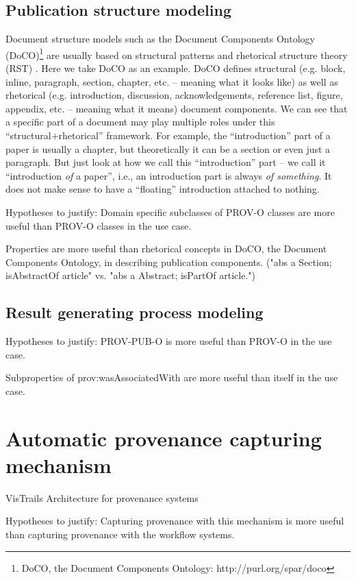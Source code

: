\subsection{Publication structure modeling}
Document structure models such as the Document Components Ontology (DoCO)\footnote{DoCO, the Document Components Ontology: http://purl.org/spar/doco} are usually based on structural patterns \cite{di2014dealing} and rhetorical structure theory (RST) \cite{taboada2006rhetorical}. Here we take DoCO as an example. DoCO defines structural (e.g. block, inline, paragraph, section, chapter, etc. -- meaning what it looks like) as well as rhetorical (e.g. introduction, discussion, acknowledgements, reference list, figure, appendix, etc. -- meaning what it means) document components. We can see that a specific part of a document may play multiple roles under this ``structural+rhetorical'' framework. For example, the ``introduction'' part of a paper is usually a chapter, but theoretically it can be a section or even just a paragraph. But just look at how we call this ``introduction'' part -- we call it ``introduction \emph{of} a paper'', i.e., an introduction part is always \emph{of something}. It does not make sense to have a ``floating'' introduction attached to nothing.


Hypotheses to justify: Domain specific subclasses of PROV-O classes are more useful than PROV-O classes in the use case.

Properties are more useful than rhetorical concepts in DoCO, the Document Components Ontology, in describing publication components. ("abs a Section; isAbstractOf article" vs. "abs a Abstract; isPartOf article.")

\subsection{Result generating process modeling}
Hypotheses to justify: PROV-PUB-O is more useful than PROV-O in the use case.

Subproperties of prov:wasAssociatedWith are more useful than itself in the use case.

\section{Automatic provenance capturing mechanism} 
VisTrails \cite{freire2014reproducibility}
Architecture for provenance systems \cite{groth2006architecture}

Hypotheses to justify: Capturing provenance with this mechanism is more useful than capturing provenance with the workflow systems.

